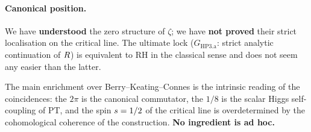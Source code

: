 \paragraph{Canonical position.}
We have \textbf{understood} the zero structure of $\zeta$; we have
\textbf{not proved} their strict localisation on the critical line.
The ultimate lock ($G_{\mathrm{HP3.a}}$: strict analytic continuation
of $R$) is equivalent to RH in the classical sense and does not
seem any easier than the latter.

The main enrichment over Berry--Keating--Connes is the intrinsic
reading of the coincidences: the $2\pi$ is the canonical commutator,
the $1/8$ is the scalar Higgs self-coupling of PT, and the spin
$s = 1/2$ of the critical line is overdetermined by the
cohomological coherence of the construction. \textbf{No ingredient
is ad hoc.}
